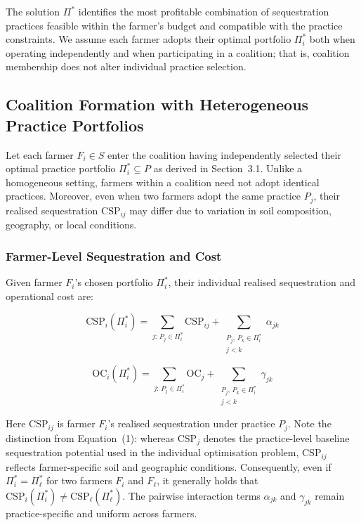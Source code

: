 \documentclass[manuscript, screen]{acmart}
\begin{document}
The solution $\Pi^*$ identifies the most profitable combination of sequestration
practices feasible within the farmer's budget and compatible with the practice
constraints. We assume each farmer adopts their optimal portfolio $\Pi_i^*$
both when operating independently and when participating in a coalition; that
is, coalition membership does not alter individual practice selection.

\subsection{Coalition Formation with Heterogeneous Practice Portfolios}

Let each farmer $F_i \in S$ enter the coalition having independently selected
their optimal practice portfolio $\Pi_i^* \subseteq P$ as derived in
Section~3.1. Unlike a homogeneous setting, farmers within a coalition need not
adopt identical practices. Moreover, even when two farmers adopt the same
practice $P_j$, their realised sequestration $\text{CSP}_{ij}$ may differ due
to variation in soil composition, geography, or local conditions.

\subsubsection*{Farmer-Level Sequestration and Cost}

Given farmer $F_i$'s chosen portfolio $\Pi_i^*$, their individual realised
sequestration and operational cost are:

\begin{equation}
    \text{CSP}_i(\Pi_i^*) = \sum_{j:\, P_j \in \Pi_i^*} \text{CSP}_{ij}
    + \sum_{\substack{P_j,\, P_k \in \Pi_i^* \\ j < k}} \alpha_{jk}
\end{equation}

\begin{equation}
    \text{OC}_i(\Pi_i^*) = \sum_{j:\, P_j \in \Pi_i^*} \text{OC}_j
    + \sum_{\substack{P_j,\, P_k \in \Pi_i^* \\ j < k}} \gamma_{jk}
\end{equation}

Here $\text{CSP}_{ij}$ is farmer $F_i$'s realised sequestration under practice
$P_j$. Note the distinction from Equation~(1): whereas $\text{CSP}_j$ denotes
the practice-level baseline sequestration potential used in the individual
optimisation problem, $\text{CSP}_{ij}$ reflects farmer-specific soil and
geographic conditions. Consequently, even if $\Pi_i^* = \Pi_\ell^*$ for two
farmers $F_i$ and $F_\ell$, it generally holds that
$\text{CSP}_i(\Pi_i^*) \neq \text{CSP}_\ell(\Pi_\ell^*)$. The pairwise
interaction terms $\alpha_{jk}$ and $\gamma_{jk}$ remain practice-specific and
uniform across farmers.
\end{document}
